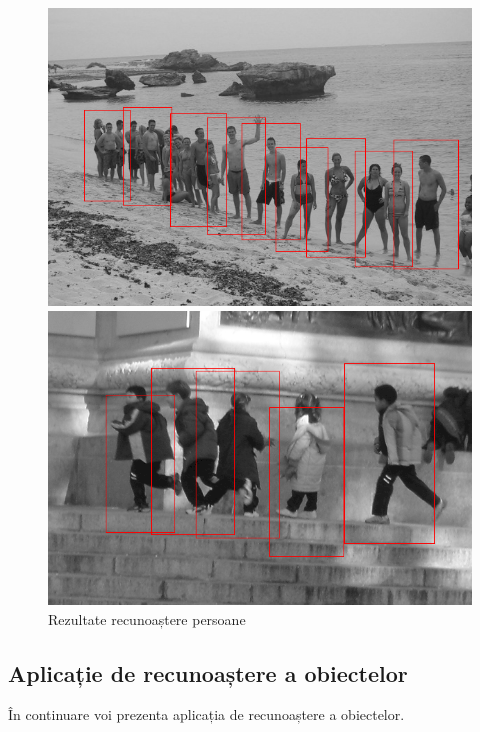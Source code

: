 \begin{figure}[H]
\begin{center}
	\includegraphics[width=1.00\textwidth]{imagini/rezultate2.png}
\end{center}
\begin{center}
	\includegraphics[width=1.00\textwidth]{imagini/rezultate3.png}
\end{center}
	\caption{Rezultate recunoaștere persoane}
	\label{fig:rezultate_recunoaster_pers2}
\end{figure}

\subsection{Aplicație de recunoaștere a obiectelor}

În continuare voi prezenta aplicația de recunoaștere a obiectelor.

